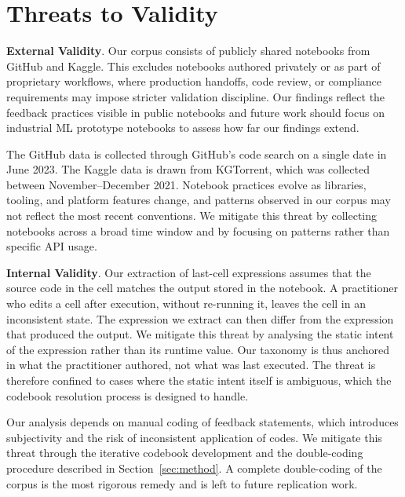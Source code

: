 \documentclass[a4paper,USenglish,cleveref,autoref,thm-restate,anonymous]{lipics-v2021}       %
\begin{document}
\section{Threats to Validity}

\textbf{External Validity}.
Our corpus consists of publicly shared notebooks from GitHub and Kaggle.
This excludes notebooks authored privately or as part of proprietary workflows,
where production handoffs, code review, or compliance requirements
may impose stricter validation discipline.
Our findings reflect the feedback practices visible in public notebooks
and future work should focus on industrial ML prototype notebooks
to assess how far our findings extend.

The GitHub data is collected through GitHub's code search on a single date in June 2023.
The Kaggle data is drawn from KGTorrent,
which was collected between November--December 2021.
Notebook practices evolve as libraries, tooling, and platform features change,
and patterns observed in our corpus may not reflect the most recent conventions.
We mitigate this threat by collecting notebooks across a broad time window
and by focusing on patterns rather than specific API usage.

\textbf{Internal Validity}.
Our extraction of last-cell expressions
assumes that the source code in the cell matches the output stored in the notebook.
A practitioner who edits a cell after execution,
without re-running it,
leaves the cell in an inconsistent state.
The expression we extract
can then differ
from the expression that produced the output.
We mitigate this threat
by analysing the static intent of the expression
rather than its runtime value.
Our taxonomy is thus anchored in what the practitioner authored,
not what was last executed.
The threat is therefore confined
to cases where the static intent itself is ambiguous,
which the codebook resolution process is designed to handle.

Our analysis depends on manual coding of feedback statements,
which introduces subjectivity
and the risk of inconsistent application of codes.
We mitigate this threat through the iterative codebook development
and the double-coding procedure described in Section~\ref{sec:method}.
A complete double-coding of the corpus
is the most rigorous remedy
and is left to future replication work.

\end{document}
